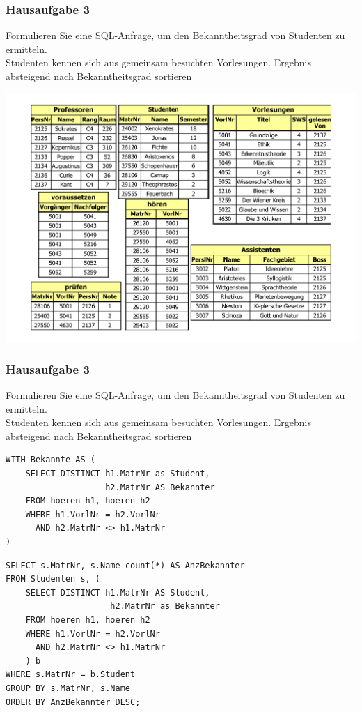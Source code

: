 \begin{frame}[fragile]
	\frametitle{Hausaufgabe 3}
	\vspace{0.25cm}

	\begin{multicols}{2}
		Formulieren Sie eine SQL-Anfrage, um den Bekanntheitsgrad von Studenten zu ermitteln. \\
		Studenten kennen sich aus gemeinsam besuchten Vorlesungen.
		Ergebnis absteigend nach Bekanntheitsgrad sortieren
		\vfill\columnbreak

		\begin{center}
			\includegraphics[height=.6\paperheight]{../img/uni.pdf}
		\end{center}
	\end{multicols}
\end{frame}

\begin{frame}[fragile]
	\frametitle{Hausaufgabe 3}
	\vspace{0.25cm}

	\begin{multicols}{2}
		Formulieren Sie eine SQL-Anfrage, um den Bekanntheitsgrad von Studenten zu ermitteln. \\
		Studenten kennen sich aus gemeinsam besuchten Vorlesungen.
		Ergebnis absteigend nach Bekanntheitsgrad sortieren

		\begin{verbatim}
WITH Bekannte AS (
	SELECT DISTINCT h1.MatrNr as Student,
	                h2.MatrNr AS Bekannter
	FROM hoeren h1, hoeren h2
	WHERE h1.VorlNr = h2.VorlNr
	  AND h2.MatrNr <> h1.MatrNr
)
		\end{verbatim}
		\vfill\columnbreak
		\begin{verbatim}
SELECT s.MatrNr, s.Name count(*) AS AnzBekannter
FROM Studenten s, (
	SELECT DISTINCT h1.MatrNr AS Student, 
	                 h2.MatrNr as Bekannter
	FROM hoeren h1, hoeren h2
	WHERE h1.VorlNr = h2.VorlNr
	  AND h2.MatrNr <> h1.MatrNr
	) b
WHERE s.MatrNr = b.Student
GROUP BY s.MatrNr, s.Name
ORDER BY AnzBekannter DESC;
		\end{verbatim}
	\end{multicols}
\end{frame}

